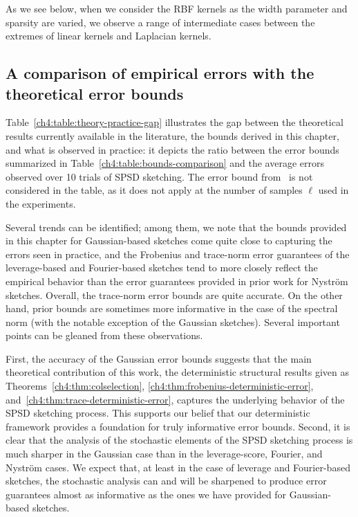 As we see below, when we consider the RBF kernels as the width parameter 
and sparsity are varied, we observe a range of intermediate cases between 
the extremes of linear kernels and Laplacian kernels.


\subsection{A comparison of empirical errors with the theoretical error bounds}

Table~\ref{ch4:table:theory-practice-gap} illustrates the gap between the theoretical results 
currently available in the literature, the bounds derived in this chapter, and what is observed in practice: it depicts the ratio
between the error bounds summarized in Table~\ref{ch4:table:bounds-comparison} and the average errors observed
over 10 trials of SPSD sketching. The error bound from~\cite{RT10} is not considered in the table,
as it does not apply at the number of samples $\ell$ used in the experiments. 

Several trends can be identified; among them, we
note that the bounds provided in this chapter for Gaussian-based sketches come quite close to capturing 
the errors seen in practice, and the Frobenius and trace-norm error guarantees of the 
leverage-based and Fourier-based sketches tend to more closely reflect the empirical behavior than
the error guarantees provided in prior work for Nystr\"om sketches. Overall, the trace-norm error
bounds are quite accurate. On the other hand, prior bounds are sometimes more informative in the case 
of the spectral norm (with the notable exception of the Gaussian sketches). Several important points
can be gleaned from these observations. 

First, the accuracy of the Gaussian error bounds suggests that the main theoretical
contribution of this work, the deterministic structural results given as 
Theorems~\ref{ch4:thm:colselection}, \ref{ch4:thm:frobenius-deterministic-error},
and~\ref{ch4:thm:trace-deterministic-error}, captures the underlying behavior of the SPSD sketching process. 
This supports our belief that our deterministic framework provides a foundation for truly 
informative error bounds. Second, it is clear that the 
analysis of the stochastic elements of the SPSD sketching process is 
much sharper in the Gaussian case than in the 
leverage-score, Fourier, and Nystr\"om cases. We expect that, at least in the 
case of leverage and Fourier-based sketches, the 
stochastic analysis can and will be sharpened to produce error guarantees 
almost as informative as the ones we have provided for
Gaussian-based sketches.

